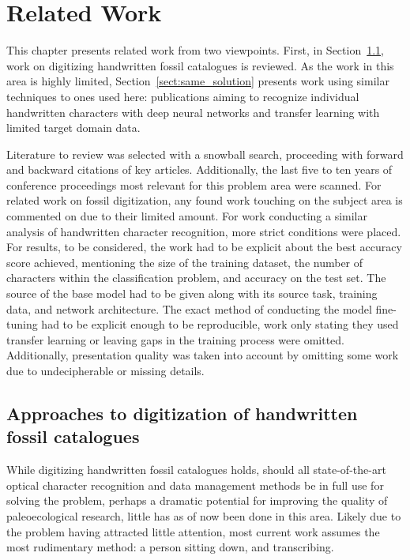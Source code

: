 \documentclass[english,twoside,openright]{UH_DS_MSc}
\begin{document}
\chapter{Related Work}

This chapter presents related work from two viewpoints. First, in Section~\ref{sect:related_same_problem},
work on digitizing handwritten fossil catalogues is reviewed. As the work 
in this area is highly limited, Section~\ref{sect:same_solution} presents work using similar techniques 
to ones used here: publications aiming to recognize individual handwritten characters 
with deep neural networks and transfer learning with limited target domain data.

Literature to review was selected with a snowball search, proceeding with forward and backward citations 
of key articles. Additionally, the last five to ten years of conference proceedings most relevant for this problem area were 
scanned. For related work on fossil digitization, any found work touching on the subject area is commented on due to their 
limited amount. For work conducting a similar analysis of handwritten character recognition, more strict conditions were placed. 
For results, to be considered, the work had to be explicit about the best accuracy score achieved,
mentioning the size of the training dataset, the number of characters within the classification problem, and accuracy on the test set.
 The source of the base model had to be given along with its source task, training data, and network architecture. The exact method of conducting the model fine-tuning had to be explicit enough to be reproducible,
work only stating they used transfer learning or leaving gaps in the training process were omitted. Additionally, 
presentation quality was taken into account by omitting some work due to
 undecipherable or missing details.

\section{Approaches to digitization of handwritten fossil catalogues}
\label{sect:related_same_problem}

While digitizing handwritten fossil catalogues holds,
should all state-of-the-art optical character recognition and data management methods 
be in full use for solving the problem, perhaps a dramatic potential for improving 
the quality of paleoecological research, little has as of now been done in this area.
Likely due to the problem having attracted little attention, 
most current work assumes the most rudimentary method: a person sitting down, and transcribing.
\end{document}
